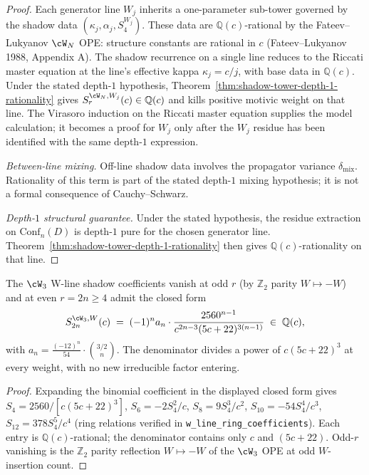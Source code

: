 \begin{proof}
Each generator line $W_j$ inherits a one-parameter sub-tower
governed by the shadow data $(\kappa_j, \alpha_j, S_4^{W_j})$. These data are $\mathbb{Q}(c)$-rational
by the Fateev--Lukyanov $\cW_N$ OPE: structure constants are rational
in $c$ (Fateev--Lukyanov 1988, Appendix A). The shadow recurrence on
a single line reduces to the Riccati master equation at the line's
effective kappa $\kappa_j = c/j$, with base data in $\mathbb{Q}(c)$.
Under the stated depth-$1$ hypothesis,
Theorem~\ref{thm:shadow-tower-depth-1-rationality} gives
$S_r^{\cW_N, W_j}(c) \in \mathbb{Q}(c)$ and kills positive motivic
weight on that line. The Virasoro induction on the Riccati master
equation supplies the model calculation; it becomes a proof for
$W_j$ only after the $W_j$ residue has been identified with the same
depth-$1$ expression.

\emph{Between-line mixing.} Off-line shadow data involves the
propagator variance $\delta_{\mathrm{mix}}$. Rationality of this term
is part of the stated depth-$1$ mixing hypothesis; it is not a formal
consequence of Cauchy--Schwarz.

\emph{Depth-$1$ structural guarantee.} Under the stated hypothesis,
the residue extraction on $\mathrm{Conf}_n(D)$ is depth-$1$ pure for
the chosen generator line. Theorem~\ref{thm:shadow-tower-depth-1-rationality}
then gives $\mathbb{Q}(c)$-rationality on that line.
\end{proof}

\begin{proposition}
\ClaimStatusProvedHere
The $\cW_3$ W-line shadow coefficients vanish at odd $r$ (by
$\mathbb{Z}_2$ parity $W \mapsto -W$) and at even $r = 2n \geq 4$
admit the closed form
\[
 S_{2n}^{\cW_3, W}(c) \;=\; (-1)^n a_n \cdot \frac{2560^{n-1}}
 {c^{2n-3} (5c + 22)^{3(n-1)}}
 \;\in\; \mathbb{Q}(c),
\]
with $a_n = \tfrac{(-12)^n}{54} \cdot \binom{3/2}{n}$. The denominator
divides a power of $c (5c+22)^3$ at every weight, with no new
irreducible factor entering.
\end{proposition}

\begin{proof}
Expanding the binomial coefficient in the displayed closed form gives
$S_4 = 2560/[c(5c+22)^3]$, $S_6 = -2 S_4^2/c$, $S_8 = 9 S_4^3/c^2$,
$S_{10} = -54 S_4^4/c^3$, $S_{12} = 378 S_4^5/c^4$ (ring relations
verified in \texttt{w\_line\_ring\_coefficients}). Each entry is
$\mathbb{Q}(c)$-rational; the denominator contains only $c$ and
$(5c+22)$. Odd-$r$ vanishing is the $\mathbb{Z}_2$ parity reflection
$W \mapsto -W$ of the $\cW_3$ OPE at odd $W$-insertion count.
\end{proof}

